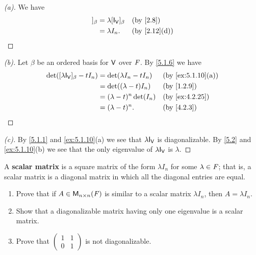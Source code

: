 \begin{proof}[(a)]
	We have
	\begin{align*}
		[\lambda \IT[\V]]_{\beta} & = \lambda [\IT[\V]]_{\beta} &  & \by{2.8}     \\
		                          & = \lambda I_n.              &  & \by{2.12}[d]
	\end{align*}
\end{proof}

\begin{proof}[(b)]
	Let \(\beta\) be an ordered basis for \(\mathsf{V}\) over \(\mathit{F}\).
	By \cref{5.1.6} we have
	\begin{align*}
		\det([\lambda \IT[\V]]_{\beta} - t I_n) & = \det(\lambda I_n - t I_n) &  & \by{ex:5.1.10}[a] \\
		                                        & = \det((\lambda - t) I_n)   &  & \by{1.2.9}        \\
		                                        & = (\lambda - t)^n \det(I_n) &  & \by{ex:4.2.25}    \\
		                                        & = (\lambda - t)^n.          &  & \by{4.2.3}
	\end{align*}
\end{proof}

\begin{proof}[(c)]
	By \cref{5.1.1} and \cref{ex:5.1.10}(a) we see that \(\lambda \IT[\V]\) is diagonalizable.
	By \cref{5.2} and \cref{ex:5.1.10}(b) we see that the only eigenvalue of \(\lambda \IT[\V]\) is \(\lambda\).
\end{proof}

\begin{ex}\label{ex:5.1.11}
	A \textbf{scalar matrix} is a square matrix of the form \(\lambda I_n\) for some \(\lambda \in \mathit{F}\);
	that is, a scalar matrix is a diagonal matrix in which all the diagonal entries are equal.
	\begin{enumerate}
		\item Prove that if \(A \in \mathsf{M}_{{n} \times n}({\mathit{F}})\) is similar to a scalar matrix \(\lambda I_n\), then \(A = \lambda I_n\).
		\item Show that a diagonalizable matrix having only one eigenvalue is a scalar matrix.
		\item Prove that \(\begin{pmatrix}
			      1 & 1 \\
			      0 & 1
		      \end{pmatrix}\) is not diagonalizable.
	\end{enumerate}
\end{ex}

